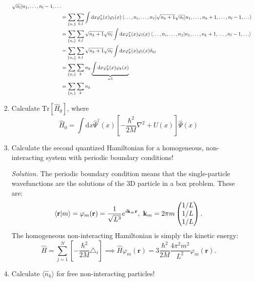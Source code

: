 \documentclass[11pt, a4paper]{article}
\newcommand{\dd}{\mathrm{d}}
\newcommand{\Tr}[1]{\mathrm{Tr}\left[#1\right]}
\begin{document}
\begin{enumerate}
\begin{align*}
{        \sqrt{n_l} |n_1, \dots, n_l-1, \dots} \\
        & = \sum\limits_{\{n_i\}}\sum\limits_{k,l}\int\dd x \varphi^*_k(x)\varphi_l(x) \braket{\dots,n_i,\dots,n_1 | 
        \sqrt{n_k+1}\sqrt{n_l} |n_1, \dots, n_k+1, \dots, n_l-1, \dots} \\
        & = \sum\limits_{\{n_i\}}\sum\limits_{k,l} \sqrt{n_k+1}\sqrt{n_l} \int\dd x \varphi^*_k(x)\varphi_l(x) \braket{\dots,n_i,\dots,n_1 |n_1, \dots, n_k+1, \dots, n_l-1, \dots} \\
        & = \sum\limits_{\{n_i\}}\sum\limits_{k,l} \sqrt{n_k+1}\sqrt{n_l} \int\dd x \varphi^*_k(x)\varphi_l(x) \delta_{kl} \\
        & = \sum\limits_{\{n_i\}}\sum\limits_{k} n_k \underbrace{\int\dd x \varphi^*_k(x)\varphi_k(x)}_{=1}\\
        & = \sum\limits_{\{n_i\}}\sum\limits_{k} n_k
    \end{align*}
    \item Calculate $\Tr {\hat H_0}$, where
    \begin{equation*}
        \hat H_0 = \int\dd x \hat\Psi^{\dagger}(x)\left[ -\frac{\hbar^2}{2M}\nabla^2 + U(x) \right]\hat\Psi(x)
    \end{equation*}
    \item Calculate the second quantized Hamiltonian for a homogeneous, non-interacting system with periodic boundary conditions!
    \par \textit{Solution.}
    The periodic boundary condition means that the single-particle wavefunctions are the solutions of the 3D particle in a box problem.
    These are:
    \begin{equation*}
        \braket{\mathbf r | m} = \varphi_m(\mathbf r) = \frac{1}{\sqrt{L^3}}e^{i\mathbf k_m \mathbf r},
        ~\mathbf k_m = 2\pi m \begin{pmatrix}
            1/L \\ 1/L \\ 1/L
        \end{pmatrix}.
    \end{equation*}
    The homogeneous non-interacting Hamiltonian is simply the kinetic energy:
    \begin{equation*}
        \hat H = \sum_{j=1}^N\left[-\frac{\hbar^2}{2M}\triangle_i\right]
        \implies \hat H \varphi_m(\mathbf r) = 3\frac{\hbar^2}{2M}\frac{4\pi^2 m^2}{L^2}\varphi_m(\mathbf r).
    \end{equation*}
    \item Calculate $\langle \hat n_k \rangle$ for free non-interacting particles!

\end{enumerate}
\end{document}
